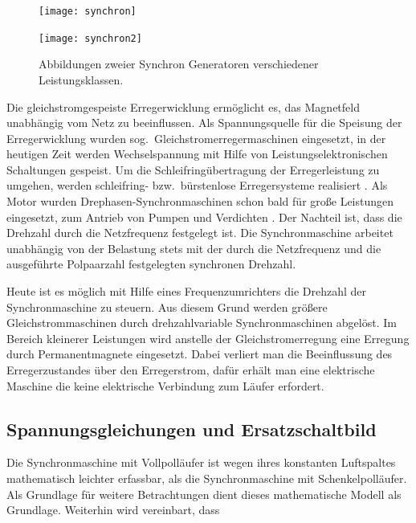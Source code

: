 \begin{figure}[h!]
\centering
\begin{minipage}{6cm}
\texttt{[image: synchron]}
\end{minipage}
\hfill
\begin{minipage}{6cm}
\texttt{[image: synchron2]}
\end{minipage}
\caption{Abbildungen zweier Synchron Generatoren verschiedener Leistungsklassen.}
\label{fig:synchron-generatoren}
\end{figure}

Die gleichstromgespeiste Erregerwicklung ermöglicht es, das Magnetfeld unabhängig vom Netz zu beeinflussen.
Als Spannungsquelle für die Speisung der Erregerwicklung wurden sog.\ Gleichstromerregermaschinen eingesetzt, in der heutigen Zeit werden Wechselspannung mit Hilfe von Leistungselektronischen Schaltungen gespeist.
Um die Schleifringübertragung der Erregerleistung zu umgehen, werden schleifring- bzw.\ bürstenlose Erregersysteme realisiert \autocite{fischer2009}.
Als Motor wurden Drephasen-Synchronmaschinen schon bald für große Leistungen eingesetzt, \zB zum Antrieb von Pumpen und Verdichten \autocite[S.~486]{mullerI2005}.
Der Nachteil ist, dass die Drehzahl durch die Netzfrequenz festgelegt ist.
Die Synchronmaschine arbeitet unabhängig von der Belastung stets mit der durch die Netzfrequenz und die ausgeführte Polpaarzahl festgelegten synchronen Drehzahl.

Heute ist es möglich mit Hilfe eines Frequenzumrichters die Drehzahl der Synchronmaschine zu steuern.
Aus diesem Grund werden größere Gleichstrommaschinen durch drehzahlvariable Synchronmaschinen abgelöst.
Im Bereich kleinerer Leistungen wird anstelle der Gleichstromerregung eine Erregung durch Permanentmagnete eingesetzt.
Dabei verliert man die Beeinflussung des Erregerzustandes über den Erregerstrom, dafür erhält man eine elektrische Maschine die keine elektrische Verbindung zum Läufer erfordert.

\subsection{Spannungsgleichungen und Ersatzschaltbild}\label{sec:spannungsgleichung-esb}

Die Synchronmaschine mit Vollpolläufer ist wegen ihres konstanten Luftspaltes mathematisch leichter erfassbar, als die Synchronmaschine mit Schenkelpolläufer.
Als Grundlage für weitere Betrachtungen dient dieses mathematische Modell als Grundlage.
Weiterhin wird vereinbart, dass

